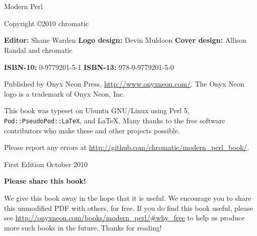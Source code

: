 \chapter*{}
\thispagestyle{empty}

\huge{Modern Perl}
\newline
\newline
\normalsize

Copyright \copyright\mbox{}2010 chromatic

\vfill
\textbf{Editor:} Shane Warden\newline
\textbf{Logo design:} Devin Muldoon\newline
\textbf{Cover design:} Allison Randal and chromatic

\textbf{ISBN-10:} 0-9779201-5-1\newline
\textbf{ISBN-13:} 978-0-9779201-5-0

Published by Onyx Neon Press, \url{http://www.onyxneon.com/}.
The Onyx Neon logo is a trademark of Onyx Neon, Inc.

This book was typeset on Ubuntu GNU/Linux using Perl 5,
\textnhtt{Pod::PseudoPod::LaTeX}, and \LaTeX. Many thanks to the free software
contributors who make these and other projects possible.

Please report any errors at
\url{http://github.com/chromatic/modern_perl_book/}.

First Edition October 2010

\pagebreak
\thispagestyle{empty}

\huge
\textbf{Please share this book!}
\newline
\newline
\normalsize

We give this book away in the hope that it is useful.  We encourage you to
share this unmodified PDF with others, for free.  If you do find this book
useful, please see \url{http://onyxneon.com/books/modern_perl/#why_free} to
help us produce more such books in the future.
\newline
Thanks for reading!
